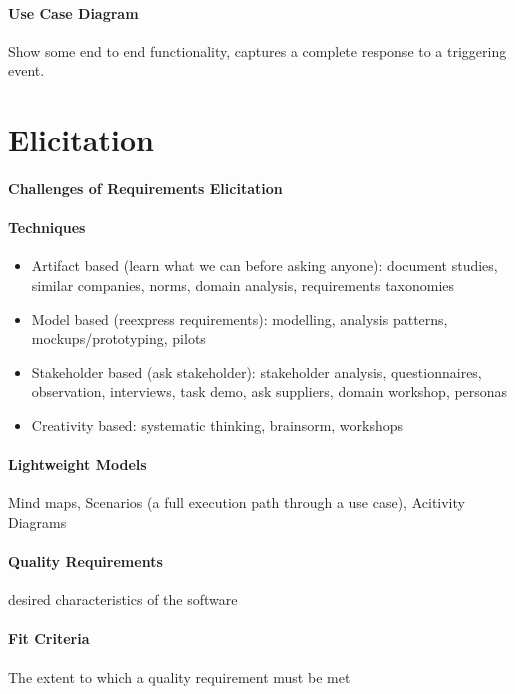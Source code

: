 \documentclass[12pt]{article}
\begin{document}
\paragraph{Use Case Diagram} 
\label{par:use_case_diagram}
Show some end to end functionality, captures a complete response to a triggering event. 


\section*{Elicitation}
\label{sec:elicitation}
\paragraph{Challenges of Requirements Elicitation} 
\label{par:challenges_of_requirements_elicitation}

\paragraph{Techniques} 
\label{par:techniques}
\begin{itemize}
	\item Artifact based (learn what we can before asking anyone): document studies, similar companies, norms, domain analysis, requirements taxonomies
	\item Model based (reexpress requirements): modelling, analysis patterns, mockups/prototyping, pilots
	\item Stakeholder based (ask stakeholder): stakeholder analysis, questionnaires, observation, interviews, task demo, ask suppliers, domain workshop, personas
	\item Creativity based: systematic thinking, brainsorm, workshops
\end{itemize}

\paragraph{Lightweight Models} 
\label{par:lightweight_models}
Mind maps, Scenarios (a full execution path through a use case), Acitivity Diagrams

\paragraph{Quality Requirements} 
\label{par:quality_requirements}
desired characteristics of the software

\paragraph{Fit Criteria} 
\label{par:fit_criteria}
The extent to which a quality requirement must be met
\end{document}
